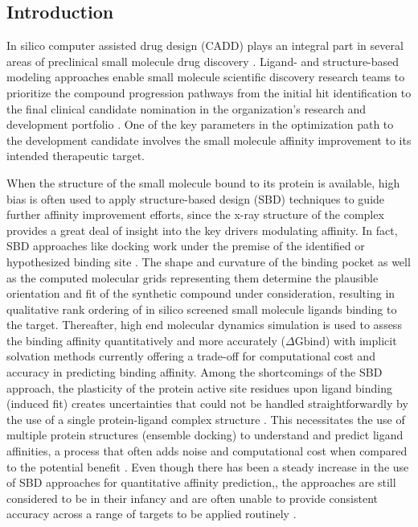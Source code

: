 \subsection{Introduction}

In silico computer assisted drug design (CADD) plays an integral part in several areas of preclinical small molecule drug discovery \cite{sliwoski2014computational}.  Ligand- and structure-based modeling approaches enable small molecule scientific discovery research teams to prioritize the compound progression pathways from the initial hit identification to the final clinical candidate nomination in the organization’s research and development portfolio \cite{ekins2007silicoA, ekins2007silicoB, macalino2015role}.  One of the key parameters in the optimization path to the development candidate involves the small molecule affinity improvement to its intended therapeutic target.  

When the structure of the small molecule bound to its protein is available, high bias is often used to apply structure-based design (SBD) techniques \cite{anderson2003process} to guide further affinity improvement efforts, since the x-ray structure of the complex provides a great deal of insight into the key drivers modulating affinity.  In fact, SBD approaches like docking work under the premise of the identified or hypothesized binding site \cite{kuntz1982geometric,kitchen2004docking}.  The shape and curvature of the binding pocket as well as the computed molecular grids representing them determine the plausible orientation and fit of the synthetic compound under consideration, resulting in qualitative rank ordering of in silico screened small molecule ligands binding to the target.  Thereafter, high end molecular dynamics simulation is used to assess the binding affinity quantitatively and more accurately ($\Delta \text{Gbind}$) \cite{homeyer2014binding, wang2015accurate, aldeghi2016accurate, de2016role} with implicit solvation methods currently offering a trade-off for computational cost and accuracy in predicting binding affinity.  Among the shortcomings of the SBD approach, the plasticity of the protein active site residues upon ligand binding (induced fit) creates uncertainties that could not be handled straightforwardly by the use of a single protein-ligand complex structure \cite{craig2010ensemble, korb2012potential}.  This necessitates the use of multiple protein structures (ensemble docking) to understand and predict ligand affinities, a process that often adds noise and computational cost when compared to the potential benefit \cite{grebner2016binding}.  Even though there has been a steady increase in the use of SBD approaches for quantitative affinity prediction,, the approaches are still considered to be in their infancy and are often unable to provide consistent accuracy across a range of targets to be applied routinely \cite{wang2015accurate}.

